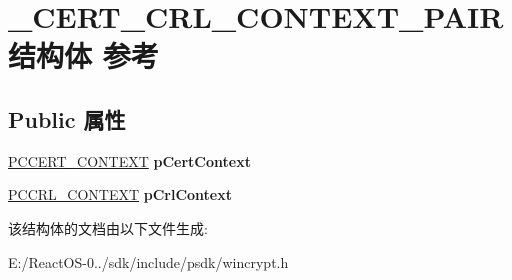 \hypertarget{struct___c_e_r_t___c_r_l___c_o_n_t_e_x_t___p_a_i_r}{}\section{\+\_\+\+C\+E\+R\+T\+\_\+\+C\+R\+L\+\_\+\+C\+O\+N\+T\+E\+X\+T\+\_\+\+P\+A\+I\+R结构体 参考}
\label{struct___c_e_r_t___c_r_l___c_o_n_t_e_x_t___p_a_i_r}
\subsection*{Public 属性}
\begin{DoxyCompactItemize}
\item 
\mbox{\label{struct___c_e_r_t___c_r_l___c_o_n_t_e_x_t___p_a_i_r_a50fb106dca28563cc92491133d7d98d1}} 
\hyperlink{struct___c_e_r_t___c_o_n_t_e_x_t}{P\+C\+C\+E\+R\+T\+\_\+\+C\+O\+N\+T\+E\+XT} {\bfseries p\+Cert\+Context}
\item 
\mbox{\label{struct___c_e_r_t___c_r_l___c_o_n_t_e_x_t___p_a_i_r_ab3e4565716c1c51a0ca131f18650adb4}} 
\hyperlink{struct___c_r_l___c_o_n_t_e_x_t}{P\+C\+C\+R\+L\+\_\+\+C\+O\+N\+T\+E\+XT} {\bfseries p\+Crl\+Context}
\end{DoxyCompactItemize}


该结构体的文档由以下文件生成\+:\begin{DoxyCompactItemize}
\item 
E\+:/\+React\+O\+S-\/0../sdk/include/psdk/wincrypt.\+h\end{DoxyCompactItemize}
